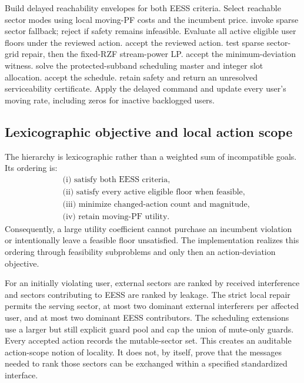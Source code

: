 \documentclass[journal]{IEEEtran}
\begin{document}
\begin{algorithm}[t]
\caption{Bounded-local predictive control and floor repair}
\label{alg:hierarchy}
\begin{algorithmic}[1]
\STATE Build delayed reachability envelopes for both EESS criteria.
\STATE Select reachable sector modes using local moving-PF costs and the incumbent price.
  \STATE invoke sparse sector fallback; reject if safety remains infeasible.
\ENDIF
\STATE Evaluate all active eligible user floors under the reviewed action.
  \STATE accept the reviewed action.
\ELSE
  \STATE test sparse sector-grid repair, then the fixed-RZF stream-power LP.
    \STATE accept the minimum-deviation witness.
  \ELSE
    \STATE solve the protected-subband scheduling master and integer slot allocation.
      \STATE accept the schedule.
    \ELSE
      \STATE retain safety and return an unresolved serviceability certificate.
    \ENDIF
  \ENDIF
\ENDIF
\STATE Apply the delayed command and update every user's moving rate, including zeros for inactive backlogged users.
\end{algorithmic}
\end{algorithm}


\subsection{Lexicographic objective and local action scope}
The hierarchy is lexicographic rather than a weighted sum of incompatible goals. Its ordering is:
\begin{equation}
\begin{aligned}
&\text{(i) satisfy both EESS criteria,}\\
&\text{(ii) satisfy every active eligible floor when feasible,}\\
&\text{(iii) minimize changed-action count and magnitude,}\\
&\text{(iv) retain moving-PF utility.}
\end{aligned}
\label{eq:lexicographic}
\end{equation}
Consequently, a large utility coefficient cannot purchase an incumbent violation or intentionally leave a feasible floor unsatisfied. The implementation realizes this ordering through feasibility subproblems and only then an action-deviation objective.

For an initially violating user, external sectors are ranked by received interference and sectors contributing to EESS are ranked by leakage. The strict local repair permits the serving sector, at most two dominant external interferers per affected user, and at most two dominant EESS contributors. The scheduling extensions use a larger but still explicit guard pool and cap the union of mute-only guards. Every accepted action records the mutable-sector set. This creates an auditable action-scope notion of locality. It does not, by itself, prove that the messages needed to rank those sectors can be exchanged within a specified standardized interface.
\end{document}
